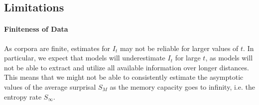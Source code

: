 
\subsection{Limitations}

\paragraph{Finiteness of Data}
As corpora are finite, estimates for $I_t$ may not be reliable for larger values of $t$.
In particular, we expect that models will underestimate $I_t$ for large $t$, as models will not be able to extract and utilize all available information over longer distances.
This means that we might not be able to consistently estimate the asymptotic values of the average surprisal $S_M$ as the memory capacity goes to infinity, i.e. the entropy rate $S_\infty$. 

